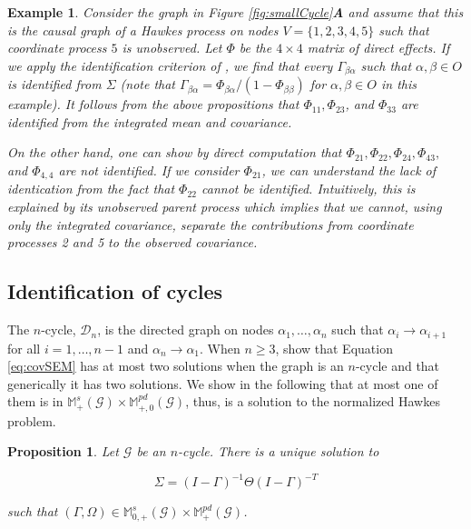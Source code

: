 \documentclass[accepted]{uai2021} %
\newtheorem{exmp}[thm]{Example}
\newtheorem{prop}[thm]{Proposition}
\begin{document}
\begin{exmp}
	Consider the graph in Figure \ref{fig:smallCycle}\textbf{A} and assume that 
	this is the causal graph of a Hawkes process on nodes $V = \{1,2,3,4,5\}$ 
	such that coordinate process $5$ is unobserved. Let $\Phi$ be the $4\times 
	4$ matrix of direct effects. If we apply the 
	identification criterion of \cite{weihs2018}, we find that every 
	$\Gamma_{\beta\alpha}$ 
	such that 
	$\alpha,\beta\in O$ is identified from $\Sigma$ (note that 
	$\Gamma_{\beta\alpha}={\Phi}_{\beta\alpha}/(1-{\Phi}_{\beta\beta})$ 
	for $\alpha,\beta\in O$ in this example). It 
	follows 
	from the 
	above propositions that $\Phi_{11}, \Phi_{23}$, and $\Phi_{33}$ are 
	identified from 
	the integrated mean and covariance.
	
	On the other hand, one can show by direct computation that $\Phi_{21}, 
	\Phi_{22}, 
	\Phi_{24}, 
	\Phi_{43},$ and $\Phi_{4,4}$ are not identified. If we consider 
	$\Phi_{21}$, we can 
	understand the lack of identication from the fact that $\Phi_{22}$ 
	cannot 
	be identified. 
	Intuitively, this is explained by its unobserved parent process which 
	implies that we 
	cannot, using only the integrated covariance, separate the contributions 
	from coordinate processes 2 and 5 to the observed covariance. 
\end{exmp}


\subsection{Identification of cycles}
\label{ssec:idCycles}

The $n$-cycle, $\mathcal{D}_n$, is the directed graph on nodes 
$\alpha_1,\ldots,\alpha_n$ such 
that $\alpha_i \rightarrow \alpha_{i+1}$ for all $i = 1,\ldots,n-1$ and 
$\alpha_n\rightarrow \alpha_1$. When $n \geq 3$, \cite{drton2011} show that 
Equation \ref{eq:covSEM} has at 
most two solutions when the graph is an $n$-cycle and that generically it has 
two solutions. We show in the following that at most one of them is in 
$\mathbb{M}_+^s(\mathcal{G}) \times 
\mathbb{M}_{+,0}^{pd}(\mathcal{G})$, thus, is a solution to the normalized 
Hawkes problem.

\begin{prop}
	Let $\mathcal{G}$ be an $n$-cycle. There is a unique solution 
	to 
	
	$$
	\Sigma = (I - \Gamma)^{-1}\Theta(I - \Gamma)^{-T}
	$$
	
	such that $(\Gamma, \Omega) \in \mathbb{M}_{0,+}^s(\mathcal{G}) \times 
	\mathbb{M}_+^{pd}(\mathcal{G})$.
\end{prop}
\end{document}
